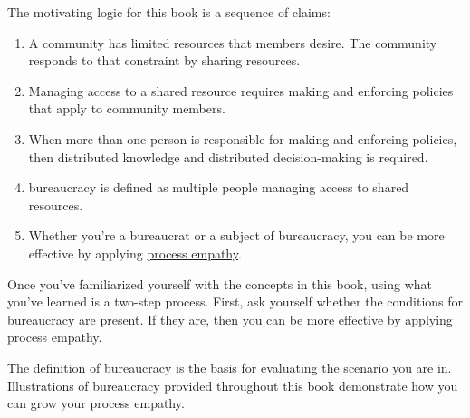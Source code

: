 The motivating logic for this book is a sequence of claims:
\begin{enumerate}
    \item A community has limited resources that members desire. The community responds to that constraint by sharing resources.
    \item Managing access to a \gls{shared resource} requires making and enforcing policies that apply to community members. 
    \item When more than one person is responsible for making and enforcing policies, then distributed knowledge and distributed decision-making is required. 
    \item \Gls{bureaucracy} is defined as multiple people managing access to \glspl{shared resource}. 
    \item Whether you're a \gls{bureaucrat} or a subject of bureaucracy, you can be more effective by applying \hyperref[sec:process-empathy]{process empathy}.
\end{enumerate}

Once you've familiarized yourself with the concepts in this book, using what you've learned is a two-step process. First, ask yourself whether the conditions for bureaucracy are present. If they are, then you can be more effective by applying process empathy.

The definition of bureaucracy is the basis for evaluating the scenario you are in. Illustrations of bureaucracy provided throughout this book demonstrate how you can grow your process empathy. 